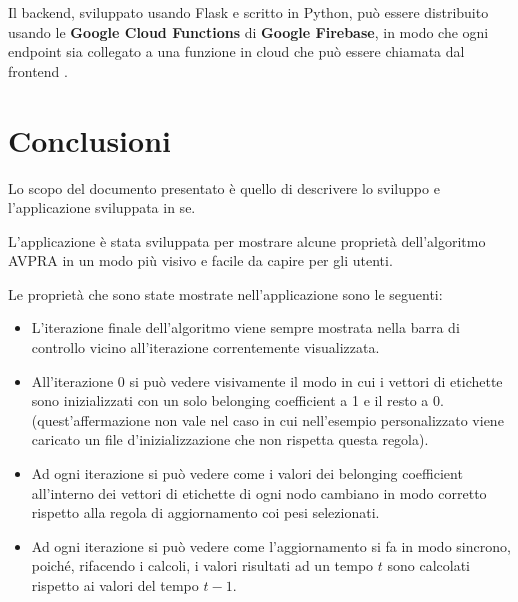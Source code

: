 \documentclass[a4paper,12pt]{report}
\begin{document}
	Il backend, sviluppato usando Flask e scritto in Python, può essere distribuito usando le \textbf{Google Cloud Functions} di \textbf{Google Firebase}, in modo che ogni endpoint sia collegato a una funzione in cloud che può essere chiamata dal frontend \cite{googlecloudfunctions}.

\chapter{Conclusioni}

Lo scopo del documento presentato è quello di descrivere lo sviluppo e l'applicazione sviluppata in se.

L'applicazione è stata sviluppata per mostrare alcune proprietà dell'algoritmo AVPRA in un modo più visivo e facile da capire per gli utenti.

Le proprietà che sono state mostrate nell'applicazione sono le seguenti:
\begin{itemize}
\item L'iterazione finale dell'algoritmo viene sempre mostrata nella barra di controllo vicino all'iterazione correntemente visualizzata.

\item All'iterazione 0 si può vedere visivamente il modo in cui i vettori di etichette sono inizializzati con un solo belonging coefficient a 1 e il resto a 0. (quest'affermazione non vale nel caso in cui nell'esempio personalizzato viene caricato un file d'inizializzazione che non rispetta questa regola).

\item Ad ogni iterazione si può vedere come i valori dei belonging coefficient all'interno dei vettori di etichette di ogni nodo cambiano in modo corretto rispetto alla regola di aggiornamento coi pesi selezionati.

\item Ad ogni iterazione si può vedere come l'aggiornamento si fa in modo sincrono, poiché, rifacendo i calcoli, i valori risultati ad un tempo $t$ sono calcolati rispetto ai valori del tempo $t-1$.
\end{itemize}
\end{document}
